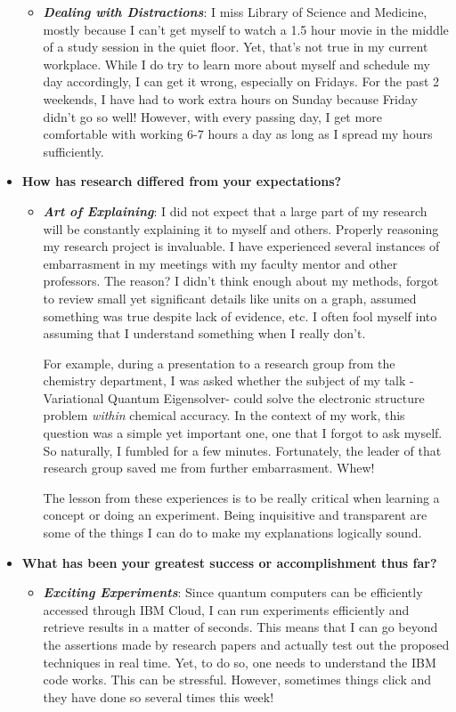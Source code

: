 \documentclass{article}
\newcommand{\s}{\item[]}
\begin{document}
\begin{itemize}
\begin{itemize}
  \s \textit{\textbf{Dealing with Distractions}}: I miss Library of Science
  and Medicine, mostly because I can't get myself to watch a 1.5 hour movie
  in the middle of a study session in the quiet floor. Yet, that's not true in
  my current workplace. While I do try to learn more about myself and schedule
  my day accordingly, I can get it wrong, especially on Fridays. For the past
  2 weekends, I have had to work extra hours on Sunday because Friday didn't
  go so well! However, with every passing day, I get more comfortable with working
  6-7 hours a day as long as I spread my hours sufficiently.
\end{itemize}

 \item \textbf{How has research differed from your expectations?}
 \begin{itemize}
   \s \textit{\textbf{Art of Explaining}}: I did not expect that a large part
   of my research will be constantly explaining it to myself and others.
    Properly reasoning my research project is invaluable. I have experienced
   several instances of embarrasment in my meetings with my faculty
   mentor and other professors. The reason? I
   didn't think enough about my methods, forgot to review small yet significant
   details like units on a graph, assumed something was true despite lack of
   evidence, etc. I often fool myself into assuming that I understand something when I really don't.

   For example, during a presentation to a research group from the chemistry
   department, I was asked whether the subject of my talk -Variational
   Quantum Eigensolver- could solve the electronic structure problem
   \textit{within} chemical accuracy. In the context of my work, this question was a simple
   yet important one, one that I forgot to ask myself. So naturally,
   I fumbled for a few minutes. Fortunately, the leader
   of that research group saved me from further embarrasment. Whew!

   The lesson from these experiences is to be really critical when learning
   a concept or doing an experiment. Being inquisitive and transparent are
   some of the things I can do to make my explanations logically sound.
 \end{itemize}
\item \textbf{What has been your greatest success or accomplishment thus far?}
\begin{itemize}
  \s \textit{\textbf{Exciting Experiments}}: Since quantum computers can
  be efficiently accessed through IBM Cloud, I can run experiments efficiently
  and retrieve results in a matter of seconds. This means that I can go
  beyond the assertions made by research papers and actually test out the
  proposed techniques in real time. Yet, to do so, one needs to understand
  the IBM code works. This can be stressful. However, sometimes things click
  and they have done so several times this week!



\end{itemize}
\end{itemize}
\end{document}
